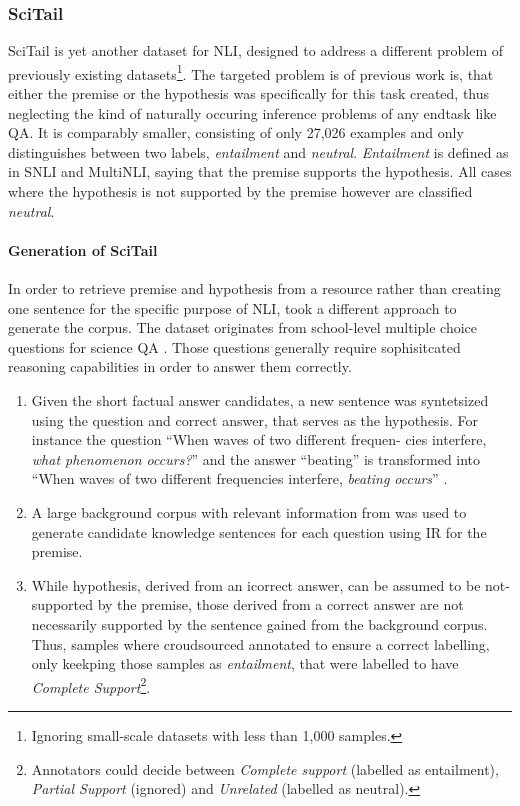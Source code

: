 \subsubsection{SciTail}
SciTail \citep{scitail} is yet another dataset for \ac{NLI}, designed to address a different problem of previously existing datasets\footnote{Ignoring small-scale datasets with less than 1,000 samples.}. The targeted problem is of previous work is, that either the premise or the hypothesis was specifically for this task created, thus neglecting the kind of naturally occuring inference problems of any endtask like \ac{QA}. It is comparably smaller, consisting of only 27,026 examples and only distinguishes between two labels, \textit{entailment} and \textit{neutral}. \textit{Entailment} is defined as in \ac{SNLI} and \ac{MultiNLI}, saying that the premise supports the hypothesis. All cases where the hypothesis is not supported by the premise however are classified \textit{neutral}.

\paragraph*{Generation of SciTail}
In order to retrieve premise and hypothesis from a resource rather than creating one sentence for the specific purpose of \ac{NLI}, \cite{scitail} took a different approach to generate the corpus. The dataset originates from school-level multiple choice questions for science \ac{QA} \citep{welbl2017crowdsourcing}. Those questions generally require sophisitcated reasoning capabilities in order to answer them correctly. 
\begin{enumerate}
\item Given the short factual answer candidates, a new sentence was syntetsized using the question and correct answer, that serves as the hypothesis. For instance the question ``When waves of two different frequen-
cies interfere, \textit{what phenomenon occurs?}'' and the answer ``beating'' is transformed into ``When waves of two different frequencies interfere, \textit{beating occurs}'' \citep{scitail}.
\item A large background corpus with relevant information from \cite{clark2016combining} was used to generate candidate knowledge sentences for each question using \ac{IR} for the premise.
\item While hypothesis, derived from an icorrect answer, can be assumed to be not-supported by the premise, those derived from a correct answer are not necessarily supported by the sentence gained from the background corpus. Thus, samples where croudsourced annotated to ensure a correct labelling, only keekping those samples as \textit{entailment}, that were labelled to have \textit{Complete Support}\footnote{Annotators could decide between \textit{Complete support} (labelled as entailment), \textit{Partial Support} (ignored) and \textit{Unrelated} (labelled as neutral).}.
\end{enumerate}



